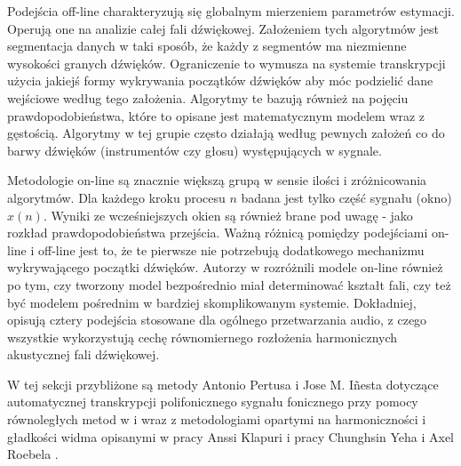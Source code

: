 \documentclass[12pt,a4paper,twoside]{mwart}
\begin{document}
Podejścia off-line charakteryzują się globalnym mierzeniem parametrów estymacji. Operują one na analizie całej fali dźwiękowej. Założeniem tych algorytmów jest segmentacja danych w taki sposób, że każdy z segmentów ma niezmienne wysokości granych dźwięków. Ograniczenie to wymusza na systemie transkrypcji użycia jakiejś formy wykrywania początków dźwięków aby móc podzielić dane wejściowe według tego założenia. Algorytmy te bazują również na pojęciu prawdopodobieństwa, które to opisane jest matematycznym modelem wraz z gęstością. Algorytmy w tej grupie często działają według pewnych założeń co do barwy dźwięków (instrumentów czy głosu) występujących w sygnale.

Metodologie on-line są znacznie większą grupą w sensie ilości i zróżnicowania algorytmów. Dla każdego kroku procesu $n$ badana jest tylko część sygnału (okno) $x(n)$. Wyniki ze wcześniejszych okien są również brane pod uwagę - jako rozkład prawdopodobieństwa przejścia. Ważną różnicą pomiędzy podejściami on-line i off-line jest to, że te pierwsze nie potrzebują dodatkowego mechanizmu wykrywającego początki dźwięków. Autorzy w 
\cite[203-227]{Transcription:Anssi:SignalProcessingMethods}
rozróżnili modele on-line również po tym, czy tworzony model bezpośrednio miał determinować kształt fali, czy też być modelem pośrednim w bardziej skomplikowanym systemie. Dokładniej, opisują cztery podejścia stosowane dla ogólnego przetwarzania audio, z czego wszystkie wykorzystują cechę równomiernego rozłożenia harmonicznych akustycznej fali dźwiękowej.

W tej sekcji przybliżone są metody Antonio Pertusa i Jose M. Iñesta dotyczące automatycznej transkrypcji polifonicznego sygnału fonicznego przy pomocy równoległych metod w \cite{Transcription:Pertus:Inharmonicity} i \cite{Transcription:Pertus:Inharmonicity2} wraz z metodologiami opartymi na harmoniczności i gładkości widma opisanymi w pracy Anssi Klapuri \cite{Transcription:Klapuri:MultipleFundamentalFrequencyEstimation} i pracy Chunghsin Yeha i Axel Roebela \cite{Transcription:Yeh:JointEvaluationF0}.
\end{document}
